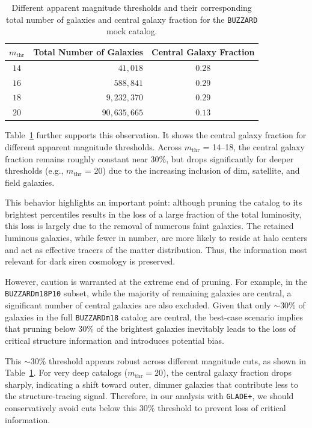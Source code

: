 \begin{table}
    \small
    \centering
    \caption[Central galaxy fraction for different $m_{\mathrm{thr}}$ for \texttt{BUZZARD}.]{Different apparent magnitude thresholds and their corresponding total number of galaxies and central galaxy fraction for the \texttt{BUZZARD} mock catalog.}
    \label{tab:MDC_catalogs}
    \begin{tabular}{c r c}
        \hline
        \textbf{$m_{\mathrm{thr}}$} & \textbf{Total Number of Galaxies} & \textbf{Central Galaxy Fraction} \\
        \hline
        $14$ & $41,018$ & $0.28$\\
        $16$ & $588,841$ & $0.29$ \\
        $18$ & $9,232,370$ & $0.29$ \\
        $20$ & $90,635,665$ & $0.13$ \\
        \hline
    \end{tabular}
\end{table}

Table~\ref{tab:MDC_catalogs} further supports this observation. It shows the central galaxy fraction for different apparent magnitude thresholds. Across $m_{\mathrm{thr}}$ = 14–18, the central galaxy fraction remains roughly constant near 30\%, but drops significantly for deeper thresholds (e.g., $m_{\mathrm{thr}}$ = 20) due to the increasing inclusion of dim, satellite, and field galaxies.

This behavior highlights an important point: although pruning the catalog to its brightest percentiles results in the loss of a large fraction of the total luminosity, this loss is largely due to the removal of numerous faint galaxies. The retained luminous galaxies, while fewer in number, are more likely to reside at halo centers and act as effective tracers of the matter distribution. Thus, the information most relevant for dark siren cosmology is preserved.

However, caution is warranted at the extreme end of pruning. For example, in the \texttt{BUZZARDm18P10} subset, while the majority of remaining galaxies are central, a significant number of central galaxies are also excluded. Given that only $\sim$30\% of galaxies in the full \texttt{BUZZARDm18} catalog are central, the best-case scenario implies that pruning below 30\% of the brightest galaxies inevitably leads to the loss of critical structure information and introduces potential bias.

This $\sim$30\% threshold appears robust across different magnitude cuts, as shown in Table~\ref{tab:MDC_catalogs}. For very deep catalogs ($m_{\mathrm{thr}} = 20$), the central galaxy fraction drops sharply, indicating a shift toward outer, dimmer galaxies that contribute less to the structure-tracing signal. Therefore, in our analysis with \texttt{GLADE+}, we should conservatively avoid cuts below this 30\% threshold to prevent loss of critical information.


